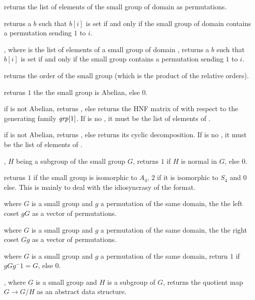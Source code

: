 returns the list of elements of the
small group  of domain  as permutations.

 returns a  $b$ such that
$b[i]$ is set if and only if the small group  of domain 
contains a permutation sending $1$ to $i$.

, where  is the list of
elements of a small group of domain , returns a  $b$ such that
$b[i]$ is set if and only if the small group contains a permutation sending $1$
to $i$.

 returns the order of the small group
 (which is the product of the relative orders).

 returns $1$ the the small group
 is Abelian, else $0$.

 if  is not Abelian,
returns , else returns the HNF matrix of  with respect to
the generating family $\hbox{\it grp\/}[1]$. If  is no , it must
be the list of elements of .

 if  is not Abelian,
returns , else returns its cyclic decomposition. If  is no
, it must be the list of elements of .

, $H$ being a subgroup of the
small group $G$, returns $1$ if $H$ is normal in $G$, else $0$.

 returns $1$ if the small group
 is isomorphic to $A_4$, $2$ if it is isomorphic to $S_4$ and
$0$ else. This is mainly to deal with the idiosyncrasy of the format.

 where $G$ is a small group and $g$ a
permutation of the same domain, the the left coset $gG$ as a vector of
permutations.

 where $G$ is a small group and $g$ a
permutation of the same domain, the the right coset $Gg$  as a vector of
permutations.

 where $G$ is a small group and
$g$ a permutation of the same domain, return $1$ if $gGg^-1=G$, else $0$.

, where $G$ is a small group and
$H$ is a subgroup of $G$, returns the quotient map $G\rightarrow G/H$
as an abstract data structure.

